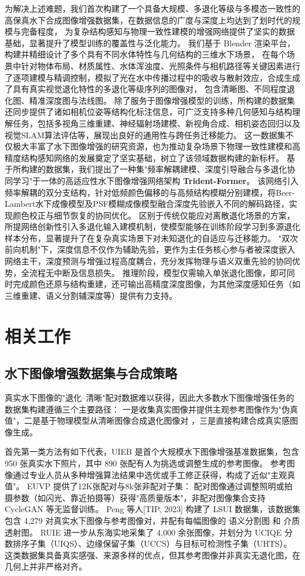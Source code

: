 \documentclass[twocolumn]{article}
\begin{document}
为解决上述难题，我们首次构建了一个具备大规模、多退化等级与多模态一致性的高保真水下合成图像增强数据集，在数据信息的广度与深度上均达到了划时代的规模与完备程度，
为复杂结构感知与物理一致性建模的增强网络提供了坚实的数据基础，显著提升了模型训练的覆盖性与泛化能力。
我们基于 Blender 渲染平台，构建并精细设计了多个具有不同水体特性与几何结构的三维水下场景，
在每个场景中针对物体布局、材质属性、水体浑浊度、光照条件与相机路径等关键因素进行了逐项建模与精调控制，模拟了光在水中传播过程中的吸收与散射效应，合成生成了具有真实视觉退化特性的多退化等级序列的图像对，
包含清晰图、不同程度退化图、精准深度图与法线图。
除了服务于图像增强模型的训练，所构建的数据集还同步提供了诸如相机位姿等结构化标注信息，可广泛支持多种几何感知与结构理解任务，包括多视角三维重建、神经辐射场建模、新视角合成、相机姿态回归以及视觉SLAM算法评估等，展现出良好的通用性与跨任务迁移能力。
这一数据集不仅极大丰富了水下图像增强的研究资源，也为推动复杂场景下物理一致性建模和高精度结构感知网络的发展奠定了坚实基础，树立了该领域数据构建的新标杆。
基于所构建的数据集，我们提出了一种集"频率解耦建模、深度引导融合与多退化协同学习"于一体的高适应性水下图像增强网络架构 \textbf{Trident-Former}。
该网络引入频率解耦的双分支结构，针对低频颜色偏移的与高频结构模糊分别建模，将Beer-Lambert水下成像模型及PSF模糊成像模型融合深度先验嵌入不同的解码路径，实现颜色校正与细节恢复的协同优化。
区别于传统仅能应对离散退化场景的方案，所提网络创新性引入多退化输入建模机制，使模型能够在训练阶段学习到多源退化样本分布，显著提升了在复杂真实场景下对未知退化的自适应与迁移能力。
"双次前向机制"下，深度信息不仅作为辅助先验，更作为主任务核心参与者被深度嵌入网络主干，深度预测与增强过程高度耦合，充分发挥物理与语义双重先验的协同优势，全流程无中断及信息损失。
推理阶段，模型仅需输入单张退化图像，即可同时完成颜色还原与结构重建，还可输出高精度深度图像，为其他深度感知任务（如三维重建、语义分割辅深度等）提供有力支持。


\section{相关工作}
\subsection{水下图像增强数据集与合成策略}
真实水下图像的"退化–清晰"配对数据难以获得，因此大多数水下图像增强任务的数据集构建遵循三个主要路径：
一是收集真实图像并提供主观参考图像作为"伪真值"，二是基于物理模型从清晰图像合成退化图像对 ，三是直接构建合成真实感图像生成\cite{ref1, ref2}。

首先第一类方法有如下代表，UIEB \cite{ref3} 是首个大规模水下图像增强基准数据集，包含 950 张真实水下照片，其中 890 张配有人为挑选或调整生成的参考图像。
参考图像通过专业人员从多种增强算法结果中选优或手工修正获得，构成了近似"主观真值"。
EUVP \cite{ref4} 提供了12K张配对与8k张非配对子集：
配对图像通过调整照明或拍摄参数（如闪光、靠近拍摄等）获得"高质量版本"，非配对图像集合支持 CycleGAN 等无监督训练。
Peng 等人[TIP, 2023] 构建了 LSUI 数据集，该数据集包含 4,279 对真实水下图像与参考图像对，并配有每幅图像的 语义分割图 和 介质透射图。
RUIE \cite{ref10} 进一步从东海实地采集了 4,000 余张图像，并划分为 UCIQE 分数排序子集（UIQS）、边缘保留子集（UCCS）与目标可检测性子集（UHTS）。
这类数据集具备真实感强、来源多样的优点，但其参考图像并非真实无退化图，在几何上并非严格对齐。
\end{document}
